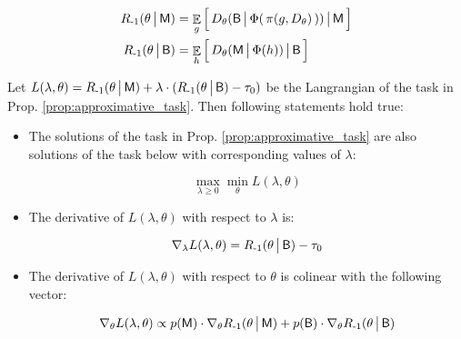 \begin{align}
    R_{{\text{-}1}}(\theta \,\big|\, \mathsf{M}) &= \mathop{\mathbb{E}}_g \Big[\, D_\theta(\mathsf{B} \,\big|\, \Phi ( \, \pi(g, D_\theta) \, )) \,\big|\, \mathsf{M} \,\Big] \\
    R_{{\text{-}1}}(\theta \,\big|\, \mathsf{B}) &= \mathop{\mathbb{E}}_{h} \Big[\, D_\theta(\mathsf{M} \,\big|\, \Phi (h)) \,\big|\, \mathsf{B} \,\Big]
\end{align}

\begin{lemma}\label{lem:langrangian_relaxation}

    Let $L(\lambda, \theta) = R_{{\text{-}1}}(\theta \,\big|\, \mathsf{M}) + \lambda \cdot (R_{{\text{-}1}}(\theta \,\big|\, \mathsf{B}) - \tau_0)$ be the Langrangian of the task in Prop. \ref{prop:approximative_task}. Then following statements hold true:

    \begin{itemize}
        \item The solutions of the task in Prop. \ref{prop:approximative_task} are also solutions of the task below with corresponding values of $\lambda$:

        \begin{equation*}\label{eq:langrangian_relaxation}
           \max_{\lambda \ge 0} \min_\theta L(\lambda, \theta)
       \end{equation*}

        \item The derivative of $L(\lambda, \theta)$ with respect to $\lambda$ is:

        \begin{equation*}\label{eq:lambda_update}
            \nabla_\lambda L(\lambda, \theta) = R_{{\text{-}1}}(\theta \,\big|\, \mathsf{B})   - \tau_0
        \end{equation*}

        \item The derivative of $L(\lambda, \theta)$ with respect to $\theta$ is colinear with the following vector:

        \begin{equation*}\label{eq:theta_update}
            \nabla_\theta L(\lambda, \theta) \propto p(\mathsf{M}) \cdot \nabla_\theta R_{{\text{-}1}}(\theta \,\big|\, \mathsf{M}) + p(\mathsf{B}) \cdot \nabla_\theta R_{{\text{-}1}}(\theta \,\big|\, \mathsf{B})
        \end{equation*}

    \end{itemize}

\end{lemma}

